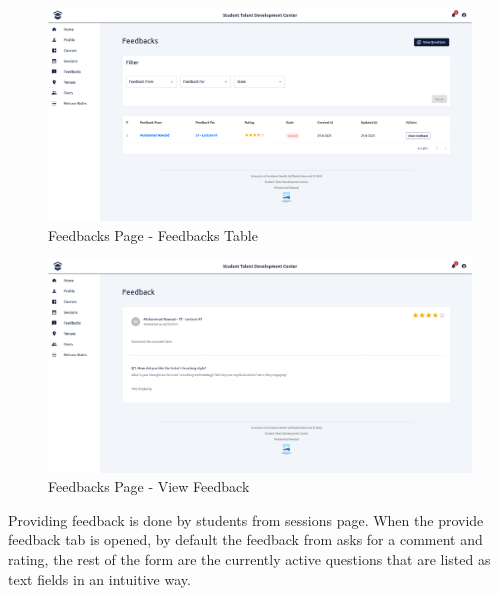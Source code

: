 \begin{justify}
    \begin{figure}[H]
        \centerline{\includegraphics[width=150mm,scale=1]{figures/implementation_and_testing/implementation/frontend/pages/Feedbacks - Table (Unread Feedback).png}}
        \caption{Feedbacks Page - Feedbacks Table}
    \end{figure}

    \begin{figure}[H]
        \centerline{\includegraphics[width=150mm,scale=1]{figures/implementation_and_testing/implementation/frontend/pages/Feedback - View.png}}
        \caption{Feedbacks Page - View Feedback}
    \end{figure}

    \vspace{0.25cm}
    \newendline Providing feedback is done by students from sessions page. When the provide feedback tab is opened, by default the feedback from asks for a comment and rating, the rest of the form are the currently active questions that are listed as text fields in an intuitive way.


\end{justify}
